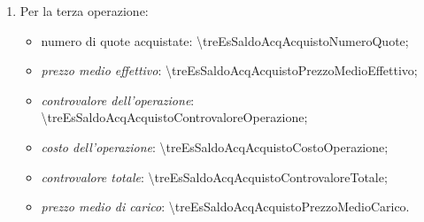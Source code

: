 \documentclass[12pt,a4paper]{article}
\newcommand{\Eur}[1]{\SI{#1}{\text{\euro{}}}}
\newcommand{\MediaPonderataDue}[4]{\frac{\num{#1} \times{} \num{#2} + \num{#3} \times{} \num{#4}}{\num{#1} + \num{#3}}}
\begin{document}
\begin{enumerate}
  Dopo la seconda operazione:
  \begin{itemize}
  \item                  numero                   quote                  nel                  saldo:
    \(\num{\unoEsSaldoAcqSaldoNumeroQuote}      +     \num{\dueEsSaldoAcqAcquistoNumeroQuote}      =
    \num{\dueEsSaldoAcqSaldoNumeroQuote}\);
  \item  il \emph{prezzo  medio effettivo  nel saldo}  è la  media ponderata  dei \emph{prezzi  medi
       effettivi} del saldo precedente e del nuovo acquisto:
    \begin{equation*}
      \MediaPonderataDue
      {\unoEsSaldoAcqSaldoNumeroQuote}{\unoEsSaldoAcqSaldoPrezzoMedioEffettivo}
      {\dueEsSaldoAcqAcquistoNumeroQuote}{\dueEsSaldoAcqAcquistoPrezzoMedioEffettivo}
      = \Eur{\dueEsSaldoAcqSaldoPrezzoMedioEffettivo}
    \end{equation*}
  \item il  \emph{prezzo medio di carico  nel saldo} è la  media ponderata dei \emph{prezzi  medi di
       carico} del saldo precedente e del nuovo acquisto:
    \begin{equation*}
      \MediaPonderataDue
      {\unoEsSaldoAcqSaldoNumeroQuote}{\unoEsSaldoAcqSaldoPrezzoMedioCarico}
      {\dueEsSaldoAcqAcquistoNumeroQuote}{\dueEsSaldoAcqAcquistoPrezzoMedioCarico}
      = \Eur{\dueEsSaldoAcqSaldoPrezzoMedioCarico}
    \end{equation*}
  \end{itemize}
  il \emph{costo medio per quota nel saldo} risulta:
  \begin{equation*}
    \num{\dueEsSaldoAcqSaldoPrezzoMedioCarico} - \num{\dueEsSaldoAcqSaldoPrezzoMedioEffettivo}
    = \Eur{\dueEsSaldoAcqSaldoCostoMedio}
  \end{equation*}

\item Per la terza operazione:
  \begin{itemize}
  \item numero di quote acquistate: \num{\treEsSaldoAcqAcquistoNumeroQuote};
  \item \emph{prezzo medio effettivo}: \Eur{\treEsSaldoAcqAcquistoPrezzoMedioEffettivo};
  \item \emph{controvalore dell'operazione}: \Eur{\treEsSaldoAcqAcquistoControvaloreOperazione};
  \item \emph{costo dell'operazione}: \Eur{\treEsSaldoAcqAcquistoCostoOperazione};
  \item \emph{controvalore totale}: \Eur{\treEsSaldoAcqAcquistoControvaloreTotale};
  \item \emph{prezzo medio di carico}: \Eur{\treEsSaldoAcqAcquistoPrezzoMedioCarico}.
  \end{itemize}


\end{enumerate}
\end{document}
